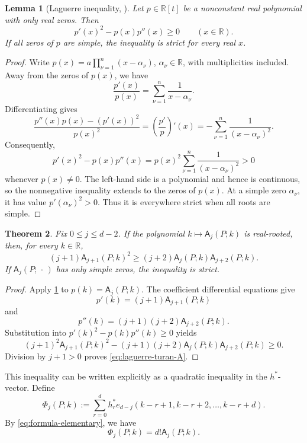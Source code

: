 \documentclass[reqno, 12pt]{article}
\numberwithin{equation}{section}
\newtheorem{theorem}{Theorem}[section]
\newtheorem{lemma}[theorem]{Lemma}
\theoremstyle{definition}
\newcommand{\R}{\mathbb{R}}
\newcommand{\A}{\mathsf{A}}
\begin{document}
\begin{lemma}[Laguerre inequality, \cite{Laguerre}]\label{lem:laguerre}
Let $p\in\R[t]$ be a nonconstant real polynomial with only real zeros.  Then
\[p'(x)^2-p(x)p''(x)\geq0 \qquad(x\in\R).
\]
If all zeros of $p$ are simple, the inequality is strict for every real $x$.
\end{lemma}
\begin{proof}
Write $p(x)=a\prod_{\nu=1}^{n}(x-\alpha_\nu)$, $\alpha_\nu\in\R$, with multiplicities included. 
Away from the zeros of $p(x)$, we have 
\[\frac{p'(x)}{p(x)}=\sum_{\nu=1}^{n}\frac1{x-\alpha_\nu}.
\]
Differentiating gives
\[\frac{p''(x)p(x)-(p'(x))^2}{p(x)^2}= \left(\frac{p'}p\right)'(x)=-\sum_{\nu=1}^{n}\frac1{(x-\alpha_\nu)^2}.
\]
Consequently,
\[ p'(x)^2-p(x)p''(x) = p(x)^2\sum_{\nu=1}^{n}\frac1{(x-\alpha_\nu)^2}>0
\]
whenever $p(x)\neq0$.  The left-hand side is a polynomial and hence is continuous, so the nonnegative inequality extends to the zeros of $p(x)$. At a simple zero $\alpha_\nu$, it has value $p'(\alpha_\nu)^2>0$. Thus it is everywhere strict when all roots are simple.
\end{proof}

\begin{theorem}\label{thm:laguerre-turan-shifted}
Fix $0\leq j\leq d-2$.  If the polynomial $k\mapsto\A_j(P;k)$ is real-rooted, then, for every $k\in\R$,
\begin{equation}\label{eq:laguerre-turan-A}
(j+1)\A_{j+1}(P;k)^2\geq(j+2)\A_j(P;k)\A_{j+2}(P;k).
\end{equation}
If $\A_j(P;\,\cdot\,)$ has only simple zeros, the inequality is strict.
\end{theorem}
\begin{proof}
Apply \cref{lem:laguerre} to $p(k)=\A_j(P;k)$.  The coefficient
differential equations give
\[ p'(k)=(j+1)\A_{j+1}(P;k)\]
and
\[ p''(k)=(j+1)(j+2)\A_{j+2}(P;k).
\]
Substitution into $p'(k)^2-p(k)p''(k)\geq0$ yields
\[(j+1)^2\A_{j+1}(P;k)^2-(j+1)(j+2)\A_j(P;k)\A_{j+2}(P;k)\geq0.
\]
Division by $j+1>0$ proves \eqref{eq:laguerre-turan-A}.
\end{proof}

This inequality can be written explicitly as a quadratic inequality in the $h^*$-vector.  Define
\begin{equation*}
\Phi_j(P;k):=\sum_{r=0}^{d}h_r^*e_{d-j}(k-r+1,k-r+2,\ldots,k-r+d).
\end{equation*}
By \eqref{eq:formula-elementary}, we have 
\begin{equation}\label{eq:Phi-A-relation}
 \Phi_j(P;k)=d!\A_j(P;k).
\end{equation}
\end{document}
